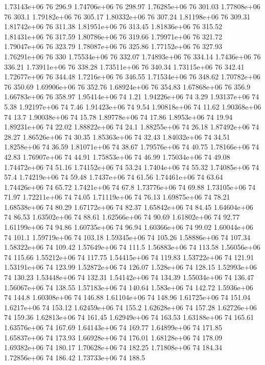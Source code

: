 1.73143e+06 76 296.9
1.74706e+06 76 298.97
1.76285e+06 76 301.03
1.77808e+06 76 303.1
1.79182e+06 76 305.17
1.80332e+06 76 307.24
1.81198e+06 76 309.31
1.81742e+06 76 311.38
1.81951e+06 76 313.45
1.81836e+06 76 315.52
1.81431e+06 76 317.59
1.80786e+06 76 319.66
1.79971e+06 76 321.72
1.79047e+06 76 323.79
1.78087e+06 76 325.86
1.77152e+06 76 327.93
1.76291e+06 76 330
1.75534e+06 76 332.07
1.74893e+06 76 334.14
1.7436e+06 76 336.21
1.73911e+06 76 338.28
1.73511e+06 76 340.34
1.73115e+06 76 342.41
1.72677e+06 76 344.48
1.7216e+06 76 346.55
1.71534e+06 76 348.62
1.70782e+06 76 350.69
1.69906e+06 76 352.76
1.68924e+06 76 354.83
1.67868e+06 76 356.9
1.66783e+06 76 358.97
1.95414e+06 74 1.21
1.94226e+06 74 3.29
1.93137e+06 74 5.38
1.92197e+06 74 7.46
1.91423e+06 74 9.54
1.90818e+06 74 11.62
1.90368e+06 74 13.7
1.90038e+06 74 15.78
1.89778e+06 74 17.86
1.8953e+06 74 19.94
1.89231e+06 74 22.02
1.88822e+06 74 24.1
1.88255e+06 74 26.18
1.87492e+06 74 28.27
1.86526e+06 74 30.35
1.85363e+06 74 32.43
1.84032e+06 74 34.51
1.8258e+06 74 36.59
1.81071e+06 74 38.67
1.79576e+06 74 40.75
1.78166e+06 74 42.83
1.76907e+06 74 44.91
1.75853e+06 74 46.99
1.75034e+06 74 49.08
1.74472e+06 74 51.16
1.74152e+06 74 53.24
1.7404e+06 74 55.32
1.74085e+06 74 57.4
1.74219e+06 74 59.48
1.7437e+06 74 61.56
1.74461e+06 74 63.64
1.74426e+06 74 65.72
1.7421e+06 74 67.8
1.73776e+06 74 69.88
1.73105e+06 74 71.97
1.72211e+06 74 74.05
1.71119e+06 74 76.13
1.69875e+06 74 78.21
1.68538e+06 74 80.29
1.67172e+06 74 82.37
1.65842e+06 74 84.45
1.64604e+06 74 86.53
1.63502e+06 74 88.61
1.62566e+06 74 90.69
1.61802e+06 74 92.77
1.61199e+06 74 94.86
1.60735e+06 74 96.94
1.60366e+06 74 99.02
1.60044e+06 74 101.1
1.59719e+06 74 103.18
1.59345e+06 74 105.26
1.58886e+06 74 107.34
1.58322e+06 74 109.42
1.57649e+06 74 111.5
1.56883e+06 74 113.58
1.56056e+06 74 115.66
1.55212e+06 74 117.75
1.54415e+06 74 119.83
1.53722e+06 74 121.91
1.53191e+06 74 123.99
1.52872e+06 74 126.07
1.528e+06 74 128.15
1.52993e+06 74 130.23
1.53448e+06 74 132.31
1.54142e+06 74 134.39
1.55034e+06 74 136.47
1.56067e+06 74 138.55
1.57183e+06 74 140.64
1.583e+06 74 142.72
1.5936e+06 74 144.8
1.60308e+06 74 146.88
1.61104e+06 74 148.96
1.61725e+06 74 151.04
1.6217e+06 74 153.12
1.62459e+06 74 155.2
1.62628e+06 74 157.28
1.62726e+06 74 159.36
1.62813e+06 74 161.45
1.62949e+06 74 163.53
1.63188e+06 74 165.61
1.63576e+06 74 167.69
1.64143e+06 74 169.77
1.64899e+06 74 171.85
1.65837e+06 74 173.93
1.66928e+06 74 176.01
1.68128e+06 74 178.09
1.69382e+06 74 180.17
1.70628e+06 74 182.25
1.71808e+06 74 184.34
1.72856e+06 74 186.42
1.73733e+06 74 188.5
